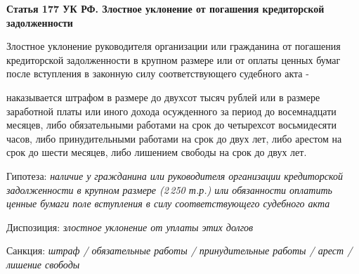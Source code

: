\documentclass[a4paper, 11pt]{article}
\begin{document}
\vskip10pt

\noindent\textbf{Статья 177 УК РФ. Злостное уклонение от погашения кредиторской задолженности}

Злостное уклонение руководителя организации или гражданина от погашения кредиторской задолженности в крупном размере или от оплаты ценных бумаг после вступления в законную силу соответствующего судебного акта -

наказывается штрафом в размере до двухсот тысяч рублей или в размере заработной платы или иного дохода осужденного за период до восемнадцати месяцев, либо обязательными работами на срок до четырехсот восьмидесяти часов, либо принудительными работами на срок до двух лет, либо арестом на срок до шести месяцев, либо лишением свободы на срок до двух лет.

\par\noindent Гипотеза: \textit{наличие у гражданина или руководителя организации кредиторской задолженности в крупном размере (2\,250 т.р.) или обязанности оплатить ценные бумаги поле вступления в силу соответствующего судебного акта}
\par\noindent Диспозиция: \textit{злостное уклонение от уплаты этих долгов }
\par\noindent Санкция: \textit{штраф / обязательные работы / принудительные работы / арест / лишение свободы }
\end{document}
